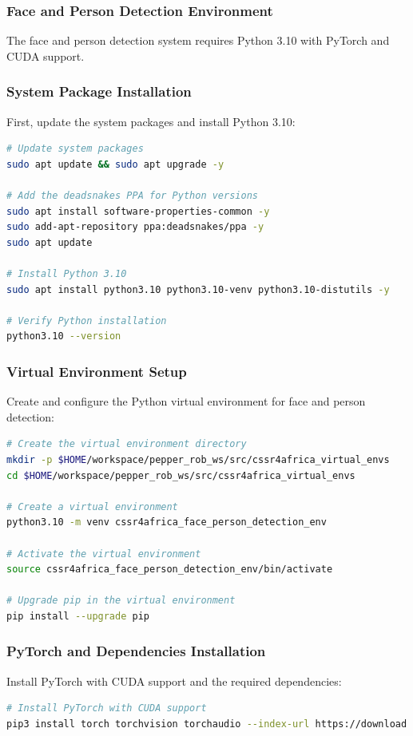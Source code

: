 \documentclass{CSSRforAfrica}
\begin{document}
{\subsubsection*{Face and Person Detection Environment}
The face and person detection system requires Python 3.10 with PyTorch and CUDA support.

\subsubsection*{System Package Installation}
First, update the system packages and install Python 3.10:
\begin{lstlisting}[style=withoutNumbering, language=bash]
# Update system packages
sudo apt update && sudo apt upgrade -y

# Add the deadsnakes PPA for Python versions
sudo apt install software-properties-common -y
sudo add-apt-repository ppa:deadsnakes/ppa -y
sudo apt update

# Install Python 3.10
sudo apt install python3.10 python3.10-venv python3.10-distutils -y

# Verify Python installation
python3.10 --version
\end{lstlisting}

\subsubsection*{Virtual Environment Setup}
Create and configure the Python virtual environment for face and person detection:
\begin{lstlisting}[style=withoutNumbering, language=bash]
# Create the virtual environment directory
mkdir -p $HOME/workspace/pepper_rob_ws/src/cssr4africa_virtual_envs
cd $HOME/workspace/pepper_rob_ws/src/cssr4africa_virtual_envs

# Create a virtual environment
python3.10 -m venv cssr4africa_face_person_detection_env

# Activate the virtual environment
source cssr4africa_face_person_detection_env/bin/activate

# Upgrade pip in the virtual environment
pip install --upgrade pip
\end{lstlisting}

\subsubsection*{PyTorch and Dependencies Installation}
Install PyTorch with CUDA support and the required dependencies:
\begin{lstlisting}[style=withoutNumbering, language=bash]
# Install PyTorch with CUDA support
pip3 install torch torchvision torchaudio --index-url https://download.pytorch.org/whl/cu118


\end{lstlisting}}
\end{document}
